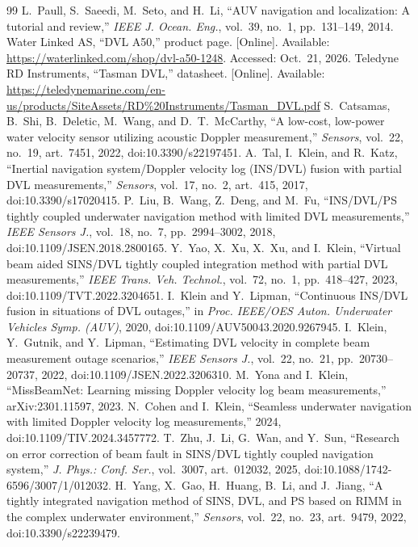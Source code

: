\documentclass[conference]{IEEEtran}
\begin{document}
\begin{thebibliography}{99}
 L.~Paull, S.~Saeedi, M.~Seto, and H.~Li, ``AUV navigation and localization: A tutorial and review,'' \emph{IEEE J. Ocean. Eng.}, vol.~39, no.~1, pp.~131--149, 2014.
 Water Linked AS, ``DVL A50,'' product page. [Online]. Available: \url{https://waterlinked.com/shop/dvl-a50-1248}. Accessed: Oct.~21, 2026.
 Teledyne RD Instruments, ``Tasman DVL,'' datasheet. [Online]. Available: \url{https://teledynemarine.com/en-us/products/SiteAssets/RD\%20Instruments/Tasman_DVL.pdf}
 S.~Catsamas, B.~Shi, B.~Deletic, M.~Wang, and D.~T.~McCarthy, ``A low-cost, low-power water velocity sensor utilizing acoustic Doppler measurement,'' \emph{Sensors}, vol.~22, no.~19, art.~7451, 2022, doi:10.3390/s22197451.
 A.~Tal, I.~Klein, and R.~Katz, ``Inertial navigation system/Doppler velocity log (INS/DVL) fusion with partial DVL measurements,'' \emph{Sensors}, vol.~17, no.~2, art.~415, 2017, doi:10.3390/s17020415.
 P.~Liu, B.~Wang, Z.~Deng, and M.~Fu, ``INS/DVL/PS tightly coupled underwater navigation method with limited DVL measurements,'' \emph{IEEE Sensors J.}, vol.~18, no.~7, pp.~2994--3002, 2018, doi:10.1109/JSEN.2018.2800165.
 Y.~Yao, X.~Xu, X.~Xu, and I.~Klein, ``Virtual beam aided SINS/DVL tightly coupled integration method with partial DVL measurements,'' \emph{IEEE Trans. Veh. Technol.}, vol.~72, no.~1, pp.~418--427, 2023, doi:10.1109/TVT.2022.3204651.
 I.~Klein and Y.~Lipman, ``Continuous INS/DVL fusion in situations of DVL outages,'' in \emph{Proc. IEEE/OES Auton. Underwater Vehicles Symp. (AUV)}, 2020, doi:10.1109/AUV50043.2020.9267945.
 I.~Klein, Y.~Gutnik, and Y.~Lipman, ``Estimating DVL velocity in complete beam measurement outage scenarios,'' \emph{IEEE Sensors J.}, vol.~22, no.~21, pp.~20730--20737, 2022, doi:10.1109/JSEN.2022.3206310.
 M.~Yona and I.~Klein, ``MissBeamNet: Learning missing Doppler velocity log beam measurements,'' arXiv:2301.11597, 2023.
 N.~Cohen and I.~Klein, ``Seamless underwater navigation with limited Doppler velocity log measurements,'' 2024, doi:10.1109/TIV.2024.3457772.
 T.~Zhu, J.~Li, G.~Wan, and Y.~Sun, ``Research on error correction of beam fault in SINS/DVL tightly coupled navigation system,'' \emph{J. Phys.: Conf. Ser.}, vol.~3007, art.~012032, 2025, doi:10.1088/1742-6596/3007/1/012032.
 H.~Yang, X.~Gao, H.~Huang, B.~Li, and J.~Jiang, ``A tightly integrated navigation method of SINS, DVL, and PS based on RIMM in the complex underwater environment,'' \emph{Sensors}, vol.~22, no.~23, art.~9479, 2022, doi:10.3390/s22239479.

\end{thebibliography}
\end{document}
